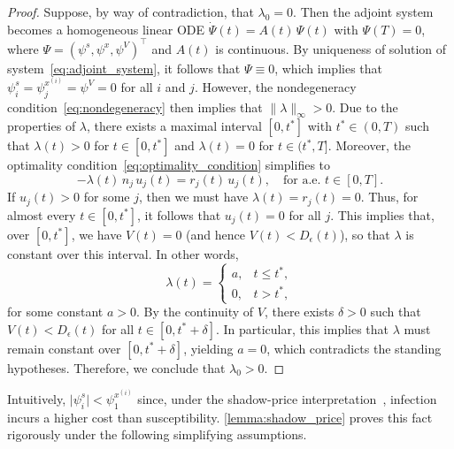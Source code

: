 \documentclass[letterpaper, 10 pt, conference]{ieeeconf}
\begin{document}
\begin{proof}
    Suppose, by way of contradiction, that $\lambda_0 = 0$. 
    Then the adjoint system becomes a homogeneous linear ODE $\dot\Psi(t)=A(t)\,\Psi(t)$ with 
    $\Psi(T)=0$, where \(\Psi=(\psi^s,\psi^x,\psi^V)^\top\) and \(A(t)\) is continuous.
    By uniqueness of solution of system~\eqref{eq:adjoint_system}, it follows that $\Psi \equiv 0$, which implies that $\psi^s_i = \psi^{x^{(i)}}_j = \psi^V = 0$ for all $i$ and $j$. 
    However, the nondegeneracy condition~\eqref{eq:nondegeneracy} then implies that $\|\lambda\|_{\infty} > 0$. 
    Due to the properties of $\lambda$, there exists a maximal interval $[0,t^*]$ with $t^* \in (0,T)$ such that $\lambda(t) > 0$ for $t \in [0,t^*]$ and $\lambda(t)=0$ for $t \in (t^*,T]$. 
    Moreover, the optimality condition~\eqref{eq:optimality_condition} simplifies to
    \[
    -\lambda(t)\,n_j\,u_j(t) = r_j(t)\,u_j(t),\quad \text{for a.e. } t\in[0,T].
    \]
    If $u_j(t)>0$ for some $j$, then we must have $\lambda(t)=r_j(t)=0$. 
    Thus, for almost every $t \in [0,t^*]$, it follows that $u_j(t)=0$ for all $j$. 
    This implies that, over $[0,t^*]$, we have $V(t)=0$ (and hence $V(t) < D_\epsilon(t)$), so that $\lambda$ is constant over this interval. 
    In other words,
    \[
    \lambda(t)=
        \begin{cases}
        a, & t\le t^*,\\[1mm]
        0, & t>t^*,
        \end{cases}
    \]
    for some constant $a>0$. 
    By the continuity of $V$, there exists $\delta>0$ such that $V(t)<D_\epsilon(t)$ for all \(t\in[0,t^*+\delta]\). 
    In particular, this implies that $\lambda$ must remain constant over $[0,t^*+\delta]$, yielding $a=0$, which contradicts the standing hypotheses.
    Therefore, we conclude that $\lambda_0>0$.
\end{proof}

Intuitively, $\lvert\psi^s_i\rvert<\psi^{x^{(i)}}_1$ since, under the shadow-price interpretation~\cite{behncke2000optimal}, infection incurs a higher cost than susceptibility.
\autoref{lemma:shadow_price} proves this fact rigorously under the following simplifying assumptions.
\end{document}

